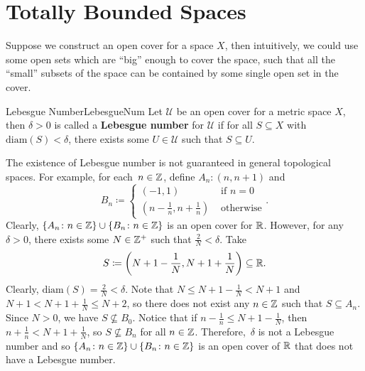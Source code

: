 \documentclass[math]{amznotes}
\theoremstyle{remark}
\begin{document}
\section{Totally Bounded Spaces}
Suppose we construct an open cover for a space $X$, then intuitively, we could use some open sets which are ``big'' enough to cover the space, such that all the ``small'' subsets of the space can be contained by some single open set in the cover.
\begin{dfnbox}{Lebesgue Number}{LebesgueNum}
    Let $\mathcal{U}$ be an open cover for a metric space $X$, then $\delta > 0$ is called a {\color{red} \textbf{Lebesgue number}} for $\mathcal{U}$ if for all $S \subseteq X$ with $\mathrm{diam}\left(S\right) < \delta$, there exists some $U \in \mathcal{U}$ such that $S \subseteq U$. 
\end{dfnbox}
The existence of Lebesgue number is not guaranteed in general topological spaces. For example, for each~$n \in \mathbb{Z}$, define $A_n \colon \left(n, n + 1\right)$ and 
\begin{equation*}
    B_n \coloneqq \begin{cases}
        \left(-1, 1\right) & \text{ if } n = 0 \\
        \left(n - \frac{1}{n}, n + \frac{1}{n}\right) & \text{ otherwise}
    \end{cases}.
\end{equation*}
Clearly, $\left\{A_n \colon n \in \mathbb{Z}\right\} \cup \left\{B_n \colon n \in \mathbb{Z}\right\}$ is an open cover for $\mathbb{R}$. However, for any $\delta > 0$, there exists some $N \in \mathbb{Z}^+$ such that $\frac{2}{N} < \delta$. Take 
\begin{equation*}
    S \coloneqq \left(N + 1 - \frac{1}{N}, N + 1 + \frac{1}{N}\right) \subseteq \mathbb{R}.
\end{equation*}
Clearly, $\mathrm{diam}\left(S\right) = \frac{2}{N} < \delta$. Note that $N \leq N + 1 - \frac{1}{N} < N + 1$ and $N + 1 < N + 1 + \frac{1}{N} \leq N + 2$, so there does not exist any $n \in \mathbb{Z}$ such that $S \subseteq A_n$. Since $N > 0$, we have $S \not\subseteq B_0$. Notice that if $n - \frac{1}{n} \leq N + 1 - \frac{1}{N}$, then $n + \frac{1}{n} < N + 1 + \frac{1}{N}$, so $S \not\subseteq B_n$ for all $n \in \mathbb{Z}$. Therefore,~$\delta$ is not a Lebesgue number and so $\left\{A_n \colon n \in \mathbb{Z}\right\} \cup \left\{B_n \colon n \in \mathbb{Z}\right\}$ is an open cover of $\mathbb{R}$ that does not have a Lebesgue number.
\end{document}
